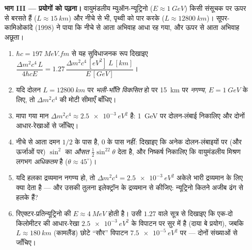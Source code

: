 \begin{problem}[{सप्ताहांत समस्या --- पृथ्वी भर में द्वि-स्तरीय
दोलन}]
\medskip\noindent\textbf{भाग III --- प्रयोगों को पढ़ना।}
वायुमंडलीय म्युऑन-न्यूट्रिनो ($E \approx \qty{1}{GeV}$) किसी संसूचक पर
ऊपर से बरसते हैं ($L \approx \qty{15}{km}$) और नीचे से भी, पृथ्वी को
पार करके ($L \approx \qty{12800}{km}$)। सूपर-कामिओकांदे
(1998) ने पाया कि नीचे से आता अभिवाह आधा रह गया, और ऊपर से आता अभिवाह अछूता।
\begin{enumerate}[resume]
  \item $\hbar c = \qty{197}{MeV.fm}$ से यह सुविधाजनक रूप दिखाइए
        $\dfrac{\Delta m^2c^4\,L}{4\hbar cE} = 1.27\,
        \dfrac{\Delta m^2c^4\,[\unit{eV^2}]\ L\,[\unit{km}]}
        {E\,[\unit{GeV}]}$।
  \item यदि दोलन $L =
        \qty{12800}{km}$ पर \emph{भली-भाँति विकसित} हो पर
        \qty{15}{km} पर \emph{नगण्य}, $E = \qty{1}{GeV}$ के लिए, तो
        $\Delta m^2c^4$ की मोटी सीमाएँ बाँधिए।
  \item मापा गया मान $\Delta m^2c^4 \approx
        \qty{2.5e-3}{eV^2}$ है: \qty{1}{GeV} पर दोलन-लंबाई
        निकालिए और दोनों आधार-रेखाओं से जाँचिए।
  \item नीचे से आता दमन $1/2$ के पास है, $0$ के पास नहीं:
        दिखाइए कि अनेक दोलन-लंबाइयों पर (और ऊर्जाओं पर) $\sin^2$
        का \emph{औसत} $\tfrac12\sin^22\theta$ देता है, और
        निष्कर्ष निकालिए कि वायुमंडलीय मिश्रण लगभग
        \emph{अधिकतम} है ($\theta \approx 45^\circ$)।
  \item यदि हलका द्रव्यमान नगण्य हो, तो $\Delta m^2c^4 = \qty{2.5e-3}{eV^2}$
        अकेले भारी द्रव्यमान के लिए क्या देता है --- और
        उसकी तुलना इलेक्ट्रॉन के द्रव्यमान से कीजिए: न्यूट्रिनो कितने
        अजीब ढंग से हलके हैं?
  \item रिएक्टर-प्रतिन्यूट्रिनो की $E \approx \qty{4}{MeV}$ होती है।
        उसी $1.27$ वाले सूत्र से दिखाइए कि एक-दो किलोमीटर की
        आधार-रेखा $\qty{2.5e-3}{eV^2}$ के विपाटन पर सुर में है
        (दाया बे प्रयोग), जबकि $L \approx \qty{180}{km}$
        (कामलैंड) छोटे ``सौर'' विपाटन
        $\qty{7.5e-5}{eV^2}$ पर --- दोनों संख्याओं से जाँचिए।
\end{enumerate}


\end{problem}
